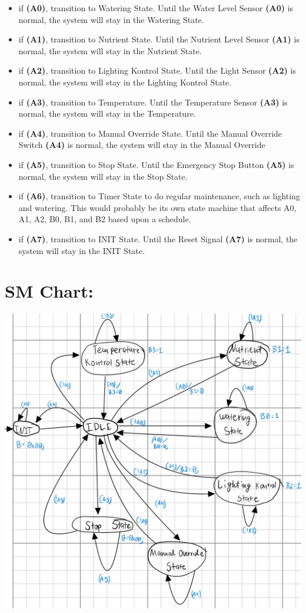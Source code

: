 \documentclass[12pt]{article}
\begin{document}
\begin{itemize}
  \item if \textbf{(A0)}, transition to Watering State.
    Until the Water Level Sensor \textbf{(A0)} is normal, the system will stay in the Watering State.
  \item if \textbf{(A1)}, transition to Nutrient State.
    Until the Nutrient Level Sensor \textbf{(A1)} is normal, the system will stay in the Nutrient State.
  \item if \textbf{(A2)}, transition to Lighting Kontrol State.
    Until the Light Sensor \textbf{(A2)} is normal, the system will stay in the Lighting Kontrol State.
  \item if \textbf{(A3)}, transition to Temperature.
    Until the Temperature Sensor \textbf{(A3)} is normal, the system will stay in the Temperature.
  \item if \textbf{(A4)}, transition to Manual Override State.
    Until the Manual Override Switch \textbf{(A4)} is normal, the system will stay in the Manual Override
  \item if \textbf{(A5)}, transition to Stop State.
    Until the Emergency Stop Button \textbf{(A5)} is normal, the system will stay in the Stop State.
  \item if \textbf{(A6)}, transition to Timer State to do regular maintenance, such as lighting and watering.
    This would probably be its own state machine that affects A0, A1, A2, B0, B1, and B2 based upon a schedule.
  \item if \textbf{(A7)}, transition to INIT State.
    Until the Reset Signal \textbf{(A7)} is normal, the system will stay in the INIT State.
\end{itemize} 
 
\pagebreak
\section{SM Chart:}

\includegraphics[width=\textwidth]{120B-EC1.jpeg.png}
\end{document}
